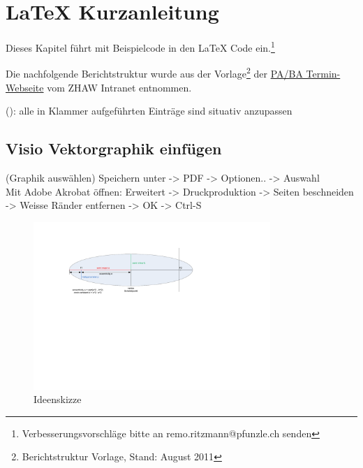 %
%

\chapter{LaTeX Kurzanleitung}\label{chap.anleitung}
Dieses Kapitel führt mit Beispielcode in den LaTeX Code ein.\footnote{Verbesserungsvorschläge bitte an remo.ritzmann@pfunzle.ch senden}

Die nachfolgende Berichtstruktur wurde aus der Vorlage\footnote{Berichtstruktur Vorlage, Stand: August 2011} der \href{https://intra.zhaw.ch/departemente/school-of-engineering/studium-standort-winterthur/studierende/projektarbeit-bachelorarbeit.html}{PA/BA Termin-Webseite} vom ZHAW Intranet entnommen.

(): alle in Klammer aufgeführten Einträge sind situativ anzupassen



\section{Visio Vektorgraphik einfügen}\label{visio}
(Graphik auswählen) Speichern unter -> PDF -> Optionen.. -> Auswahl\\
Mit Adobe Akrobat öffnen: Erweitert -> Druckproduktion -> Seiten beschneiden -> Weisse Ränder entfernen -> OK -> Ctrl-S

\begin{figure}[H]
	\centering
		\includegraphics[width=0.8\textwidth]{images/visio/visio.pdf}
	\caption{Ideenskizze}
	\label{fig.Skizze}
\end{figure}

